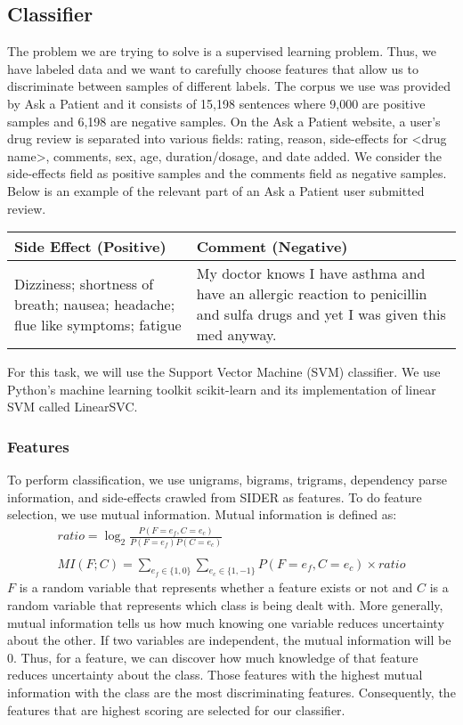 \documentclass{acm_proc_article-sp}
\begin{document}
\subsection{Classifier}
The problem we are trying to solve is a supervised learning problem. Thus, we have labeled data and we want to carefully choose features that allow us to discriminate between samples of different labels. The corpus we use was provided by Ask a Patient and it consists of 15,198 sentences where 9,000 are positive samples and 6,198 are negative samples. On the Ask a Patient website, a user's drug review is separated into various fields: rating, reason, side-effects for <drug name>, comments, sex, age, duration/dosage, and date added. We consider the side-effects field as positive samples and the comments field as negative samples. Below is an example of the relevant part of an Ask a Patient user submitted review.

\begin{tabular}{| p{4cm} | p{4cm} |}
\hline
Side Effect (Positive) & Comment (Negative) \\ \hline
Dizziness; shortness of breath; nausea; headache; flue like symptoms; fatigue & My doctor knows I have asthma and have an allergic reaction to penicillin and sulfa drugs and yet I was given this med anyway. \\ \hline
\end{tabular} 

For this task, we will use the Support Vector Machine (SVM) classifier. We use Python's machine learning toolkit scikit-learn and its implementation of linear SVM called LinearSVC.

\subsubsection{Features}
To perform classification, we use unigrams, bigrams, trigrams, dependency parse information, and side-effects crawled from SIDER as features. To do feature selection, we use mutual information. Mutual information is defined as: 
\begin{gather*}
ratio = \log_{2} \frac{P(F=e_f,C=e_c)}{P(F=e_f)P(C=e_c)} \\ \\
MI(F;C) = \sum\limits_{e_f \in \{1,0\}} \sum\limits_{e_c \in \{1,-1\}}P(F=e_f,C=e_c) \times ratio
\end{gather*}
$F$ is a random variable that represents whether a feature exists or not and $C$ is a random variable that represents which class is being dealt with. More generally, mutual information tells us how much knowing one variable reduces uncertainty about the other. If two variables are independent, the mutual information will be 0. Thus, for a feature, we can discover how much knowledge of that feature reduces uncertainty about the class. Those features with the highest mutual information with the class are the most discriminating features. Consequently, the features that are highest scoring are selected for our classifier.
\end{document}
